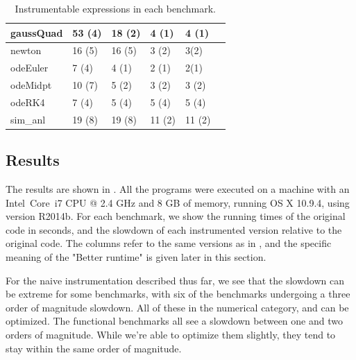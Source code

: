 \begin{table}
\begin{tabular}{| l | l | l | l | l | l |}
  gaussQuad   & 53 (4) & 18 (2) & 4 (1) & 4 (1) \\ \hline
  newton      & 16 (5) & 16 (5) & 3 (2) & 3(2) \\ \hline
  odeEuler    & 7 (4) & 4 (1) & 2 (1) & 2(1) \\\hline
  odeMidpt    & 10 (7) & 5 (2) & 3 (2) & 3 (2) \\ \hline
  odeRK4      & 7 (4) & 5 (4) & 5 (4) & 5 (4) \\ \hline
  sim\_anl    & 19 (8) & 19 (8) & 11 (2) & 11 (2) \\ \hline
\end{tabular}
\caption{Instrumentable expressions in each benchmark.}
\label{tab:InstrumentationBenchmarksInstrumentable}
\end{table}

\subsection{Results}

The results are shown in . All the
programs were executed on a machine with an Intel\textregistered \,
Core\texttrademark \, i7 CPU @ 2.4 GHz and 8 GB of memory, running OS X 10.9.4,
using \matlab version R2014b. For each benchmark, we show the running times of
the original code in seconds, and the slowdown of each instrumented version
relative to the original code. The columns refer to the same versions as in
, and the specific
meaning of the "Better runtime" is given later in this section.

For the naive instrumentation described thus far, we see that the slowdown can
be extreme for some benchmarks, with six of the benchmarks undergoing a three
order of magnitude slowdown. All of these in the numerical category, and can be
optimized. The functional benchmarks all see a slowdown between one and two
orders of magnitude. While we're able to optimize them slightly, they tend to
stay within the same order of magnitude.

